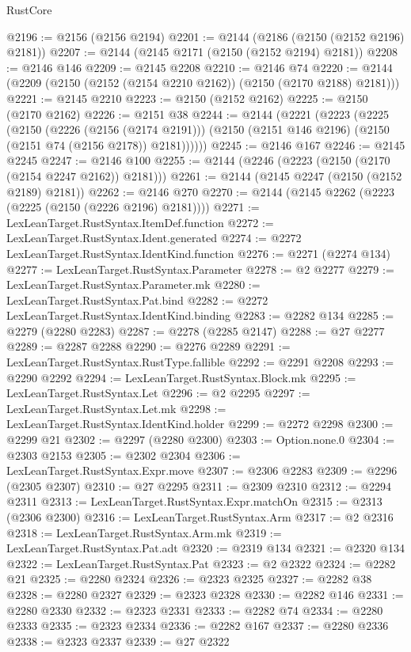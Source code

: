 \begin{lexlean}{RustCore}
\begin{coremodule}
@2196 := @2156 (@2156 @2194)
@2201 := @2144 (@2186 (@2150 (@2152 @2196) @2181))
@2207 := @2144 (@2145 @2171 (@2150 (@2152 @2194) @2181))
@2208 := @2146 @146
@2209 := @2145 @2208
@2210 := @2146 @74
@2220 := @2144 (@2209 (@2150 (@2152 (@2154 @2210 @2162)) (@2150 (@2170 @2188) @2181)))
@2221 := @2145 @2210
@2223 := @2150 (@2152 @2162)
@2225 := @2150 (@2170 @2162)
@2226 := @2151 @38
@2244 := @2144
    (@2221
      (@2223
        (@2225
          (@2150
            (@2226 (@2156 (@2174 @2191)))
            (@2150 (@2151 @146 @2196) (@2150 (@2151 @74 (@2156 @2178)) @2181))))))
@2245 := @2146 @167
@2246 := @2145 @2245
@2247 := @2146 @100
@2255 := @2144 (@2246 (@2223 (@2150 (@2170 (@2154 @2247 @2162)) @2181)))
@2261 := @2144 (@2145 @2247 (@2150 (@2152 @2189) @2181))
@2262 := @2146 @270
@2270 := @2144 (@2145 @2262 (@2223 (@2225 (@2150 (@2226 @2196) @2181))))
@2271 := LexLeanTarget.RustSyntax.ItemDef.function
@2272 := LexLeanTarget.RustSyntax.Ident.generated
@2274 := @2272 LexLeanTarget.RustSyntax.IdentKind.function
@2276 := @2271 (@2274 @134)
@2277 := LexLeanTarget.RustSyntax.Parameter
@2278 := @2 @2277
@2279 := LexLeanTarget.RustSyntax.Parameter.mk
@2280 := LexLeanTarget.RustSyntax.Pat.bind
@2282 := @2272 LexLeanTarget.RustSyntax.IdentKind.binding
@2283 := @2282 @134
@2285 := @2279 (@2280 @2283)
@2287 := @2278 (@2285 @2147)
@2288 := @27 @2277
@2289 := @2287 @2288
@2290 := @2276 @2289
@2291 := LexLeanTarget.RustSyntax.RustType.fallible
@2292 := @2291 @2208
@2293 := @2290 @2292
@2294 := LexLeanTarget.RustSyntax.Block.mk
@2295 := LexLeanTarget.RustSyntax.Let
@2296 := @2 @2295
@2297 := LexLeanTarget.RustSyntax.Let.mk
@2298 := LexLeanTarget.RustSyntax.IdentKind.holder
@2299 := @2272 @2298
@2300 := @2299 @21
@2302 := @2297 (@2280 @2300)
@2303 := Option.none.{0}
@2304 := @2303 @2153
@2305 := @2302 @2304
@2306 := LexLeanTarget.RustSyntax.Expr.move
@2307 := @2306 @2283
@2309 := @2296 (@2305 @2307)
@2310 := @27 @2295
@2311 := @2309 @2310
@2312 := @2294 @2311
@2313 := LexLeanTarget.RustSyntax.Expr.matchOn
@2315 := @2313 (@2306 @2300)
@2316 := LexLeanTarget.RustSyntax.Arm
@2317 := @2 @2316
@2318 := LexLeanTarget.RustSyntax.Arm.mk
@2319 := LexLeanTarget.RustSyntax.Pat.adt
@2320 := @2319 @134
@2321 := @2320 @134
@2322 := LexLeanTarget.RustSyntax.Pat
@2323 := @2 @2322
@2324 := @2282 @21
@2325 := @2280 @2324
@2326 := @2323 @2325
@2327 := @2282 @38
@2328 := @2280 @2327
@2329 := @2323 @2328
@2330 := @2282 @146
@2331 := @2280 @2330
@2332 := @2323 @2331
@2333 := @2282 @74
@2334 := @2280 @2333
@2335 := @2323 @2334
@2336 := @2282 @167
@2337 := @2280 @2336
@2338 := @2323 @2337
@2339 := @27 @2322

\end{coremodule}
\end{lexlean}
